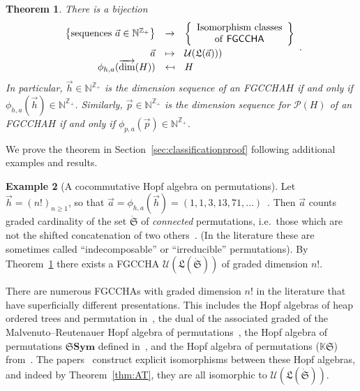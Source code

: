 \documentclass[11pt]{amsart}
\newtheorem{theorem}{Theorem}[section]
\theoremstyle{definition}
\newtheorem{example}[theorem]{Example}
\numberwithin{equation}{section}
\def\NN{{\mathbb N}}
\def\ZZ{{\mathbb Z}}
\newcommand{\FGCCHA}{\textsf{FGCCHA}\xspace}
\newcommand{\FGCCHAs}{\textsf{FGCCHA}s\xspace}
\newcommand{\vecdim}{\overrightarrow{\dim}}
\begin{document}
\begin{theorem}
\label{thm:a sequence}
There is a bijection
\[
\begin{array}{rcl}
\left\{ \text{sequences }\vec{a} \in \NN^{\ZZ_+} \right\} & \to & \left\{ \begin{array}{c} \text{Isomorphism classes} \\ \text{of \FGCCHA} \end{array} \right\} \\[2ex]
\vec{a} & \mapsto & \mathcal{U}(\mathfrak{L}(\vec{a}))) \\
\phi_{h,a}(\vecdim(H)) & \mapsfrom & H
\end{array}.
\]
In particular, $\vec{h} \in \NN^{\ZZ_+}$ is the dimension sequence of an \FGCCHA $H$ if and only if $\phi_{h, a}(\vec{h}) \in \NN^{\ZZ_+}$.  
Similarly, $\vec{p} \in \NN^{\ZZ_{+}}$ is the dimension sequence for $\mathcal{P}(H)$ of an \FGCCHA $H$ if and only if $\phi_{p, a}(\vec{p}) \in \NN^{\ZZ_{+}}$.
\end{theorem}

We prove the theorem in Section~\ref{sec:classificationproof} following additional examples and results. 

\begin{example}[A cocommutative Hopf algebra on permutations]
\label{example:hopf_algebras_of_permutations}
    Let $\vec{h} = (n!)_{n \geq 1}$, so that $\vec{a} = \phi_{h,a}(\vec{h}) = (1,1,3,13,71,\ldots)$~\cite[\href{https://oeis.org/A003319}{A003319}]{OEIS}.  
    Then $\vec{a}$ counts graded cardinality of the set $\dot{\mathfrak{S}}$ of \emph{connected} permutations, i.e.~those which are not the shifted concatenation of two others~\cite{AS05}.  
    (In the literature these are sometimes called ``indecomposable'' or ``irreducible'' permutations).
    By Theorem~\ref{thm:a sequence} there exists a \textsf{FGCCHA}
    $\mathcal{U}(\mathfrak{L}(\dot{\mathfrak{S}}))$ of graded dimension $n!$.  
    
    There are numerous \FGCCHAs with graded dimension $n!$ in the literature that have superficially different presentations.  
    This includes the Hopf algebras of heap ordered trees and permutation in~\cite{GL09}, the dual of the associated graded of the Malvenuto--Reutenauer Hopf algebra of permutations~\cite{AS05cc}, the Hopf algebra of permutations $\mathbf{\mathfrak{S}Sym}$ defined in~\cite[\S 3]{HNT08}, and the Hopf algebra of permutations ($\mathbb{K}\mathfrak{S}$) from~\cite[\S 5]{Li15}.
    The papers~\cite{AS05cc, GL09, HNT08, Li15} construct explicit isomorphisms between these Hopf algebras, and indeed by Theorem~\ref{thm:AT}, they are all isomorphic to $\mathcal{U}(\mathfrak{L}(\dot{\mathfrak{S}}))$.
    \end{example}
\end{document}
